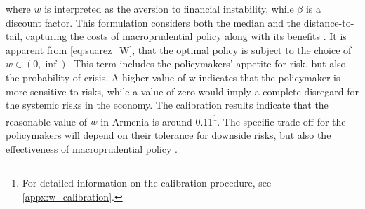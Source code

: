 where $w$ is interpreted as the aversion to financial instability, while $\beta$ is a discount factor. This formulation considers both the median and the distance-to-tail, capturing the costs of macroprudential policy along with its benefits \citep{cecchetti_2021}. It is apparent from \autoref{eq:suarez_W}, that the optimal policy is subject to the choice of $w\in(0,\inf)$. This term includes the policymakers’ appetite for risk, but also the probability of crisis. A higher value of w indicates that the policymaker is more sensitive to risks, while a value of zero would imply a complete disregard for the systemic risks in the economy. The calibration results indicate that the reasonable value of $w$ in Armenia is around 0.11\footnote{For detailed information on the calibration procedure, see \ref{appx:w_calibration}.}. The specific trade-off for the policymakers will depend on their tolerance for downside risks, but also the effectiveness of macroprudential policy \citep{esrb2021, suarez2022}.


